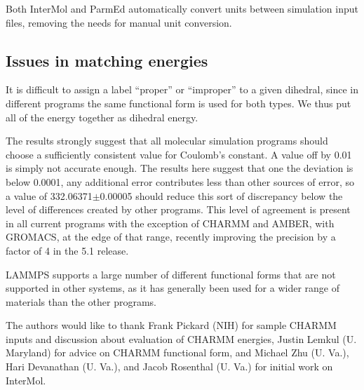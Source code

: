 Both InterMol and ParmEd automatically convert units
between simulation input files, removing the needs for manual unit
conversion.




\subsection*{Issues in matching energies}

It is difficult to assign a label ``proper'' or ``improper'' to a
given dihedral, since in different programs the same functional form
is used for both types. We thus put all of the energy together as
dihedral energy.

The results strongly suggest that all molecular simulation programs
should choose a sufficiently consistent value for Coulomb's
constant. A value off by 0.01 is simply not accurate enough.  The
results here suggest that one the deviation is below 0.0001, any
additional error contributes less than other sources of error, so a
value of 332.06371$\pm$0.00005 should reduce this sort of discrepancy
below the level of differences created by other programs.  This level
of agreement is present in all current programs with the exception of
CHARMM and AMBER, with GROMACS, at the edge of that range, recently
improving the precision by a factor of 4 in the 5.1 release.

LAMMPS supports a large number of different functional forms that are
not supported in other systems, as it has generally been used for a
wider range of materials than the other programs.

\begin{acknowledgements}
The authors would like to thank Frank Pickard (NIH) for sample CHARMM
inputs and discussion about evaluation of CHARMM energies, Justin
Lemkul (U. Maryland) for advice on CHARMM functional form, and Michael
Zhu (U. Va.), Hari Devanathan (U. Va.), and Jacob Rosenthal (U. Va.) for initial work on
InterMol.
\end{acknowledgements}



%
%


